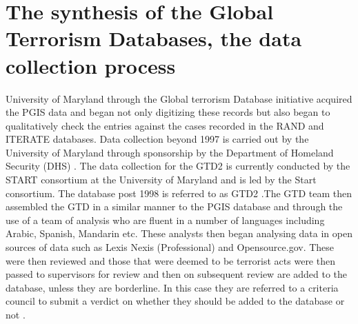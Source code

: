 \section{The synthesis of the Global Terrorism Databases, the data collection process}
\label{sec:synglobalter}

University of Maryland through the Global terrorism Database initiative acquired the PGIS data and began not only digitizing these records but also began to qualitatively check the entries against the cases recorded in the RAND and ITERATE databases. Data collection beyond 1997 is carried out by the University of Maryland through sponsorship by the Department of Homeland Security (DHS) \citep{lafree2011building}. The data collection for the GTD2 is currently conducted by the START \citep{startGTD2016} consortium at the University of Maryland and is led by the Start consortium. The database post 1998 is referred to as GTD2 \citep{lafree2010global}.The GTD team then assembled the GTD in a similar manner to the PGIS database and through the use of a team of analysis who are fluent in a number of languages including Arabic, Spanish, Mandarin etc. These analysts then began analysing data in open sources of data such as Lexis Nexis (Professional) and Opensource.gov. These were then reviewed and those that were deemed to be terrorist acts were then passed to supervisors for review and then on subsequent review are added to the database, unless they are borderline. In this case they are referred to a criteria council to submit a verdict on whether they should be added to the database or not \citep{lafree2012generating}.

